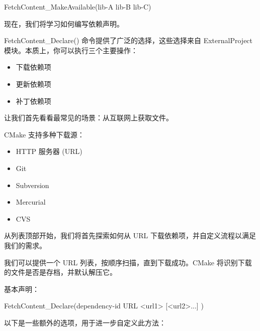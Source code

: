 \begin{cmake}
FetchContent_MakeAvailable(lib-A lib-B lib-C)
\end{cmake}

现在，我们将学习如何编写依赖声明。


FetchContent\_Declare() 命令提供了广泛的选择，这些选择来自 ExternalProject 模块。本质上，你可以执行三个主要操作：

\begin{itemize}
\item
下载依赖项

\item
更新依赖项

\item
补丁依赖项
\end{itemize}

让我们首先看看最常见的场景：从互联网上获取文件。

CMake 支持多种下载源：

\begin{itemize}
\item
HTTP 服务器 (URL)

\item
Git

\item
Subversion

\item
Mercurial

\item
CVS
\end{itemize}

从列表顶部开始，我们将首先探索如何从 URL 下载依赖项，并自定义流程以满足我们的需求。


我们可以提供一个 URL 列表，按顺序扫描，直到下载成功。CMake 将识别下载的文件是否是存档，并默认解压它。

基本声明：

\begin{shell}
FetchContent_Declare(dependency-id
                     URL <url1> [<url2>...]
)
\end{shell}

以下是一些额外的选项，用于进一步自定义此方法：

